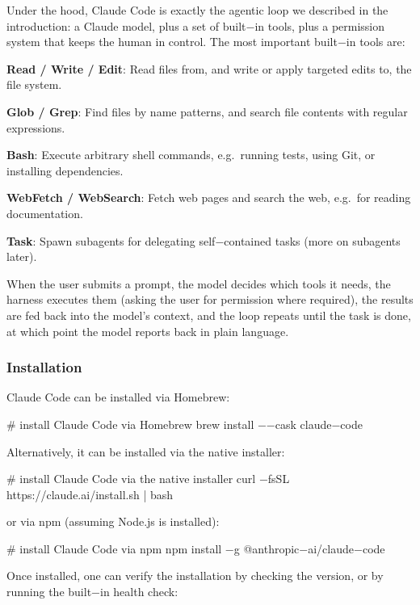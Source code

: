 Under the hood, Claude Code is exactly the agentic loop we described in the introduction: a Claude model, plus a set
of built$-$in tools, plus a permission system that keeps the human in control. The most important built$-$in tools
are:
\bit
\item \textbf{Read / Write / Edit}: Read files from, and write or apply targeted edits to, the file system.
\item \textbf{Glob / Grep}: Find files by name patterns, and search file contents with regular expressions.
\item \textbf{Bash}: Execute arbitrary shell commands, e.g.\ running tests, using Git, or installing dependencies.
\item \textbf{WebFetch / WebSearch}: Fetch web pages and search the web, e.g.\ for reading documentation.
\item \textbf{Task}: Spawn subagents for delegating self$-$contained tasks (more on subagents later).
\eit

When the user submits a prompt, the model decides which tools it needs, the harness executes them (asking the user
for permission where required), the results are fed back into the model's context, and the loop repeats until the
task is done, at which point the model reports back in plain language.

\subsubsection{Installation}

Claude Code can be installed via Homebrew:

\begin{bash}
# install Claude Code via Homebrew
brew install $-$$-$cask claude$-$code
\end{bash}

Alternatively, it can be installed via the native installer:

\begin{bash}
# install Claude Code via the native installer
curl $-$fsSL https://claude.ai/install.sh | bash
\end{bash}

or via npm (assuming Node.js is installed):

\begin{bash}
# install Claude Code via npm
npm install $-$g @anthropic$-$ai/claude$-$code
\end{bash}

Once installed, one can verify the installation by checking the version, or by running the built$-$in health check:

